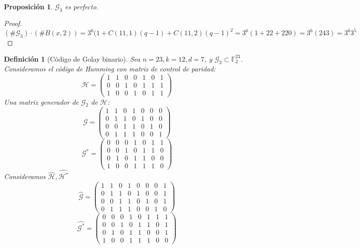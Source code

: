 \documentclass[spanish]{book}
\newtheorem{mydef}{Definición}
\newtheorem{proposi}{Proposición}
\begin{document}
\begin{proposi}
	$\mathcal{G}_3$ es perfecto.
\end{proposi}

\begin{proof}
	$(\# \mathcal{G}_3 ) \cdot (\# B(x, 2))=3^6(1+C(11, 1)(q-1)+C(11, 2)(q-1)^2=3^6(1+22+220)=3^6(243)=3^6 3^5$
\end{proof}

\begin{mydef}[Código de Golay binario]
	Sea $n=23, k=12, d=7$, y $\mathcal{G}_2 \subset \mathbb{F}_2^{23}$. \\
	Consideramos el código de Hamming con matriz de control de paridad:
	$$
	\mathcal{H}=
	\left(
	\begin{array}{ccccccc}
	1 & 1 & 0 & 0 & 1 & 0 & 1 \\
	0 & 0 & 1 & 0 & 1 & 1 & 1 \\
	1 & 0 & 0 & 1 & 0 & 1 & 1
	\end{array}
	\right)
	$$
	Una matriz generador de $\mathcal{G}_2$ de $\mathcal{H}$:
	$$
		\mathcal{G}=
		\left(
		\begin{array}{ccccccc}
		1 & 1 & 0 & 1 & 0 & 0 & 0 \\
		0 & 1 & 1 & 0 & 1 & 0 & 0 \\
		0 & 0 & 1 & 1 & 0 & 1 & 0 \\
		0 & 1 & 1 & 1 & 0 & 0 & 1
		\end{array}
		\right)
	$$
	$$
		\mathcal{G}^*=
		\left(
		\begin{array}{ccccccc}
		0 & 0 & 0 & 1 & 0 & 1 & 1 \\
		0 & 0 & 1 & 0 & 1 & 1 & 0 \\
		0 & 1 & 0 & 1 & 1 & 0 & 0 \\
		1 & 0 & 0 & 1 & 1 & 1 & 0
		\end{array}
		\right)
	$$
	Consideramos $\hat{\mathcal{H}}, \hat{\mathcal{H}^*}$
	$$
		\hat{\mathcal{G}}=
		\left(
		\begin{array}{cccccccc}
		1 & 1 & 0 & 1 & 0 & 0 & 0 & 1 \\
		0 & 1 & 1 & 0 & 1 & 0 & 0 & 1\\
		0 & 0 & 1 & 1 & 0 & 1 & 0 & 1 \\
		0 & 1 & 1 & 1 & 0 & 0 & 1 & 0
		\end{array}
		\right)
	$$
	$$
		\hat{\mathcal{G}^*}=
		\left(
		\begin{array}{cccccccc}
		0 & 0 & 0 & 1 & 0 & 1 & 1 & 1 \\
		0 & 0 & 1 & 0 & 1 & 1 & 0 & 1\\
		0 & 1 & 0 & 1 & 1 & 0 & 0 & 1\\
		1 & 0 & 0 & 1 & 1 & 1 & 0 & 0
		\end{array}
		\right)
	$$
\end{mydef}
\end{document}
